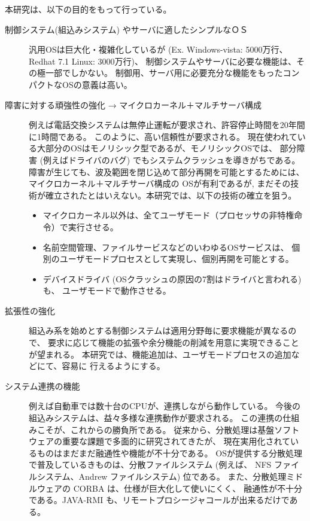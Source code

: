 \vspace{1cm}

      本研究は、以下の目的をもって行っている。

\begin{description}    
\item[制御システム(組込みシステム) やサーバに適したシンプルなＯＳ]
      汎用OSは巨大化・複雑化しているが (Ex. Windows-vista: 5000万行、Redhat 7.1 Linux: 3000万行)、
      制御システムやサーバに必要な機能は、その極一部でしかない。
      制御用、サーバ用に必要充分な機能をもったコンパクトなOSの意義は高い。
    
\item[障害に対する頑強性の強化 → マイクロカーネル＋マルチサーバ構成]
    例えば電話交換システムは無停止運転が要求され、許容停止時間を20年間に1時間である。
    このように、高い信頼性が要求される。
    現在使われている大部分のOSはモノリシック型であるが、モノリシックOSでは、
    部分障害 (例えばドライバのバグ) でもシステムクラッシュを導きがちである。
     障害が生じても、波及範囲を閉じ込めて部分再開を可能とするためには、
    マイクロカーネル＋マルチサーバ構成の OSが有利であるが, 
    まだその技術が確立されたとはいえない。本研究では、以下の技術の確立を狙う。
  \begin{itemize}
  \item マイクロカーネル以外は、全てユーザモード（プロセッサの非特権命令）で実行させる。

  \item  名前空間管理、ファイルサービスなどのいわゆるOSサービスは、
        個別のユーザモードプロセスとして実現し、個別再開を可能とする。

  \item  デバイスドライバ (OSクラッシュの原因の7割はドライバと言われる)も、
        ユーザモードで動作させる。
  \end{itemize}
    
\item[拡張性の強化]
      組込み系を始めとする制御システムは適用分野毎に要求機能が異なるので、
    要求に応じて機能の拡張や余分機能の削減を用意に実現できることが望まれる。
    本研究では、機能追加は、ユーザモードプロセスの追加などにて、容易に
    行えるようにする。
    

\item[システム連携の機能]
      例えば自動車では数十台のCPUが、連携しながら動作している。
今後の組込みシステムは、益々多様な連携動作が要求される。
この連携の仕組みこそが、これからの勝負所である。
従来から、分散処理は基盤ソフトウェアの重要な課題で多面的に研究されてきたが、
現在実用化されているものはまだまだ融通性や機能が不十分である。
OSが提供する分散処理で普及しているきものは、分散ファイルシステム 
(例えば、 NFS ファイルシステム、Andrew ファイルシステム) 位である。
また、分散処理ミドルウェアの CORBA は、仕様が巨大化して使いにくく、
融通性が不十分である。JAVA-RMI も、リモートプロシージャコールが出来るだけである。 


\end{description}
